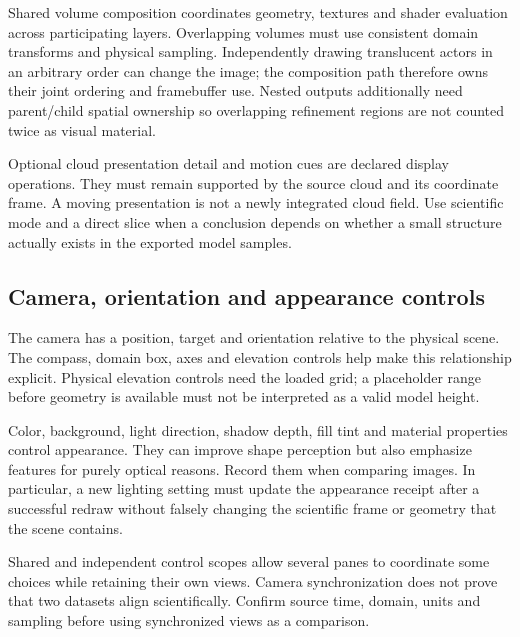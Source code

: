 Shared volume composition coordinates geometry, textures and shader evaluation
across participating layers. Overlapping volumes must use consistent domain
transforms and physical sampling. Independently drawing translucent actors in
an arbitrary order can change the image; the composition path therefore owns
their joint ordering and framebuffer use. Nested outputs additionally need
parent/child spatial ownership so overlapping refinement regions are not counted
twice as visual material.

Optional cloud presentation detail and motion cues are declared display
operations. They must remain supported by the source cloud and its coordinate
frame. A moving presentation is not a newly integrated cloud field. Use
scientific mode and a direct slice when a conclusion depends on whether a
small structure actually exists in the exported model samples.

\subsection{Camera, orientation and appearance controls}
The camera has a position, target and orientation relative to the physical
scene. The compass, domain box, axes and elevation controls help make this
relationship explicit. Physical elevation controls need the loaded grid; a
placeholder range before geometry is available must not be interpreted as a
valid model height.

Color, background, light direction, shadow depth, fill tint and material
properties control appearance. They can improve shape perception but also
emphasize features for purely optical reasons. Record them when comparing
images. In particular, a new lighting setting must update the appearance
receipt after a successful redraw without falsely changing the scientific
frame or geometry that the scene contains.

Shared and independent control scopes allow several panes to coordinate some
choices while retaining their own views. Camera synchronization does not prove
that two datasets align scientifically. Confirm source time, domain, units and
sampling before using synchronized views as a comparison.
